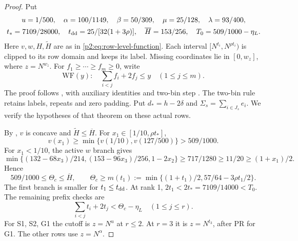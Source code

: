 \begin{proof}
Put
\[
\begin{gathered}
 u=1/500,\quad\alpha=100/1149,\quad\beta=50/309,\quad\mu=25/128,\quad\lambda=93/400,\\
 t_*=7109/28000,\quad t_{\rm dd}=25/[32(1+3\rho)],\quad\overline H=153/256,\quad T_0=509/1000-\eta_L.
\end{gathered}
\]
Here $v,w,H,\widetilde H$ are as in \eqref{p2:eq:row-level-function}.
Each interval $[N^{t_i},N^{\rho t_i})$ is clipped to its row domain and keeps its label.
Missing coordinates lie in $[0,w_z]$, where $z=N^{w_z}$.
For $f_1\ge\cdots\ge f_m\ge0$, write
\[
 \mathrm{WF}(y):\quad\sum_{i<j}f_i+2f_j\le y\quad(1\le j\le m).
\tag{P1}
\]
The proof follows \cite[Theorem~4.1, (4.1)--(4.5)]{Z1},
with auxiliary identities \cite[Lemmas~4.2--4.4]{Z1}
and two-bin step \cite[Lemma~4.5]{Z1}.
The two-bin rule retains labels, repeats and zero padding.
Put $d_*=h-2\delta$ and $\Sigma_s=\sum_{i\in J_s}e_i$.
We verify the hypotheses of that theorem on these actual rows.

By \cite[Lemma~4.2]{Z1}, $v$ is concave and $\widetilde H\le\overline H$.
For $x_1\in[1/10,\rho t_*]$,
\[
 v(x_1)\ge\min\{v(1/10),v(127/500)\}>509/1000.
\]
For $x_1<1/10$, the active $w$ branch gives
\[
 \min\{(132-68x_3)/214,(153-96x_3)/256,1-2x_2\}
 \ge717/1280\ge11/20\ge(1+x_1)/2.
\]
Hence
\[
 509/1000\le\Theta_c\le\overline H,\qquad
 \Theta_c\ge m(t_1):=\min\{(1+t_1)/2,57/64-3\rho t_1/2\}.
\tag{P5}
\]
The first branch is smaller for $t_1\le t_{\rm dd}$.
At rank 1, $2t_1<2t_*=7109/14000<T_0$.
The remaining prefix checks are
\[
 \sum_{i<j}t_i+2t_j<\Theta_c-\eta_L\quad(1\le j\le r).
\tag{P4}
\]
For S1, S2, G1 the cutoff is $z=N^u$ at $r\le2$.
At $r=3$ it is $z=N^{t_3}$, after PR for G1.
The other rows use $z=N^\alpha$.


\end{proof}
